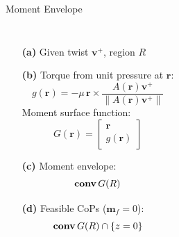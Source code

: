 \documentclass[10pt]{beamer}
\newcommand{\conv}{\mathop{\bf conv}}
\begin{document}
\begin{frame}{Moment Envelope}
  \begin{columns}[c,onlytextwidth]
    \begin{itemize}%
      \item[\textbf{(a)}] Given twist $\mathbf{v}^+$, region $R$
      \item[\textbf{(b)}] Torque from unit pressure at $\mathbf{r}$:
      \begin{equation*}
        g(\mathbf{r}) = -\mu\,\mathbf{r}\times \frac{A(\mathbf{r})\mathbf{v}^+}{\lVert A(\mathbf{r})\mathbf{v}^+ \rVert}
      \end{equation*}
      Moment surface function:
      \begin{equation*}
        G(\mathbf{r}) =
        \begin{bmatrix*}
          \mathbf{r}\\
          g(\mathbf{r})
        \end{bmatrix*}
      \end{equation*}
    \item[\textbf{(c)}] Moment envelope:
      \begin{equation*}
        \conv G(R)
      \end{equation*}
    \item[\textbf{(d)}] Feasible CoPs ($\mathbf{m}_f=0$):
      \begin{equation*}\conv G(R) \cap \{z=0\}\end{equation*}
    \end{itemize}


\end{columns}
\end{frame}
\end{document}
